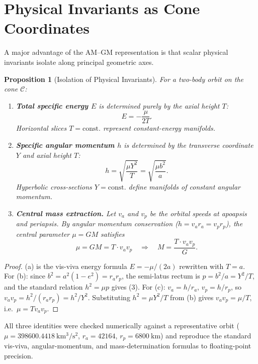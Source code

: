 \documentclass[11pt]{amsart}
\newtheorem{proposition}[theorem]{Proposition}
\begin{document}
\section{Physical Invariants as Cone Coordinates}

A major advantage of the AM--GM representation is that scalar physical invariants isolate along principal geometric axes.

\begin{proposition}[Isolation of Physical Invariants]
For a two-body orbit on the cone $\mathcal C$:
\begin{enumerate}
\item[\textup{(a)}] \textbf{Total specific energy $E$} is determined purely by the axial height $T$:
\begin{equation}
E=-\frac{\mu}{2T}. \tag{2}
\end{equation}
Horizontal slices $T=\mathrm{const.}$ represent constant-energy manifolds.
\item[\textup{(b)}] \textbf{Specific angular momentum $h$} is determined by the transverse coordinate $Y$ and axial height $T$:
\begin{equation}
h=\sqrt{\frac{\mu Y^2}{T}}=\sqrt{\frac{\mu b^2}{a}}. \tag{3}
\end{equation}
Hyperbolic cross-sections $Y=\mathrm{const.}$ define manifolds of constant angular momentum.
\item[\textup{(c)}] \textbf{Central mass extraction.} Let $v_a$ and $v_p$ be the orbital speeds at apoapsis and periapsis. By angular momentum conservation ($h=v_ar_a=v_pr_p$), the central parameter $\mu=GM$ satisfies
\begin{equation}
\mu=GM=T\cdot v_av_p \quad\Longrightarrow\quad M=\frac{T\cdot v_av_p}{G}. \tag{4}
\end{equation}
\end{enumerate}
\end{proposition}

\begin{proof}
(a) is the vis-viva energy formula $E=-\mu/(2a)$ rewritten with $T=a$. For (b): since $b^2=a^2(1-e^2)=r_ar_p$, the semi-latus rectum is $p=b^2/a=Y^2/T$, and the standard relation $h^2=\mu p$ gives (3). For (c): $v_a=h/r_a$, $v_p=h/r_p$, so $v_av_p=h^2/(r_ar_p)=h^2/Y^2$. Substituting $h^2=\mu Y^2/T$ from (b) gives $v_av_p=\mu/T$, i.e.\ $\mu=Tv_av_p$.
\end{proof}

All three identities were checked numerically against a representative orbit ($\mu=398600.4418\ \mathrm{km^3/s^2}$, $r_a=42164$, $r_p=6800\ \mathrm{km}$) and reproduce the standard vis-viva, angular-momentum, and mass-determination formulas to floating-point precision.
\end{document}
